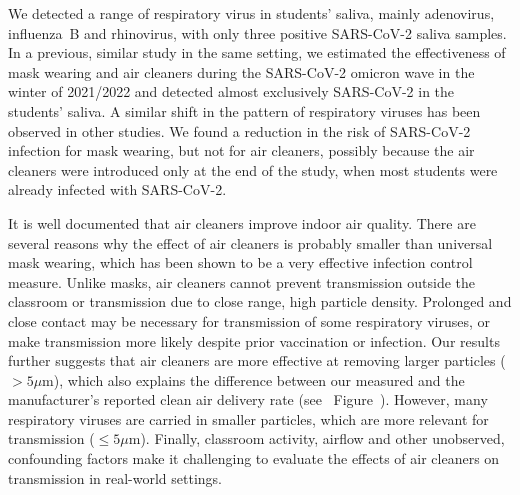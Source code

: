 \documentclass[fleqn,11pt]{wlscirep}
\begin{document}

We detected a range of respiratory virus in students' saliva, mainly adenovirus, influenza~B and rhinovirus, with only three positive SARS-CoV-2 saliva samples. In a previous, similar study in the same setting, we estimated the effectiveness of mask wearing and air cleaners during the SARS-CoV-2 omicron wave in the winter of 2021/2022 and detected almost exclusively SARS-CoV-2 in the students' saliva\cite{Banholzer2023PLoSMed}. A similar shift in the pattern of respiratory viruses has been observed in other studies\cite{Nygaard2023Lancet,Sauteur2022EuroSurv}. We found a reduction in the risk of SARS-CoV-2 infection for mask wearing, but not for air cleaners, possibly because the air cleaners were introduced only at the end of the study, when most students were already infected with SARS-CoV-2. 


It is well documented that air cleaners improve indoor air quality\cite{Park2020Build,Buising2022InfContr,Banholzer2023PLoSMed}. There are several reasons why the effect of air cleaners is probably smaller than universal mask wearing, which has been shown to be a very effective infection control measure\cite{Banholzer2023PLoSMed,Gettings2021,Leung2020NatMed,Milton2013PLoSPathogens}. Unlike masks, air cleaners cannot prevent transmission outside the classroom or transmission due to close range, high particle density. Prolonged and close contact may be necessary for transmission of some respiratory viruses\cite{Leung2020NatMed,Brankston2007LancetID}, or make transmission more likely despite prior vaccination or infection\cite{Lind2023NatCommun}. Our results further suggests that air cleaners are more effective at removing larger particles ($>5\mu$m), which also explains the difference between our measured and the manufacturer's reported clean air delivery rate (see \supp~Figure~). However, many respiratory viruses are carried in smaller particles, which are more relevant for transmission ($\leq5\mu$m)\cite{Fennelly2020}. Finally, classroom activity, airflow and other unobserved, confounding factors make it challenging to evaluate the effects of air cleaners on transmission in real-world settings. 



\end{document}
